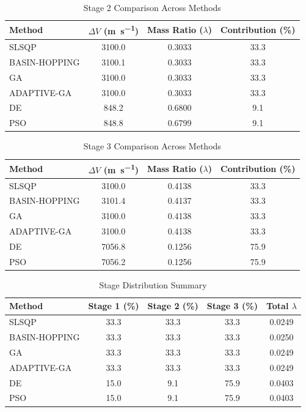 \documentclass{article}
\begin{document}
\begin{table}[H]
\centering
\caption{Stage 2 Comparison Across Methods}
\begin{tabular}{lS[table-format=4.1]S[table-format=1.4]S[table-format=3.1]}
\toprule
Method & {$\Delta V$ (\si{\meter\per\second})} & {Mass Ratio ($\lambda$)} & {Contribution (\%)} \\
\midrule
SLSQP        & 3100.0 & 0.3033 & 33.3 \\
BASIN-HOPPING & 3100.1 & 0.3033 & 33.3 \\
GA           & 3100.0 & 0.3033 & 33.3 \\
ADAPTIVE-GA  & 3100.0 & 0.3033 & 33.3 \\
DE           & 848.2 & 0.6800 & 9.1 \\
PSO          & 848.8 & 0.6799 & 9.1 \\
\bottomrule
\end{tabular}
\end{table}

\begin{table}[H]
\centering
\caption{Stage 3 Comparison Across Methods}
\begin{tabular}{lS[table-format=4.1]S[table-format=1.4]S[table-format=3.1]}
\toprule
Method & {$\Delta V$ (\si{\meter\per\second})} & {Mass Ratio ($\lambda$)} & {Contribution (\%)} \\
\midrule
SLSQP        & 3100.0 & 0.4138 & 33.3 \\
BASIN-HOPPING & 3101.4 & 0.4137 & 33.3 \\
GA           & 3100.0 & 0.4138 & 33.3 \\
ADAPTIVE-GA  & 3100.0 & 0.4138 & 33.3 \\
DE           & 7056.8 & 0.1256 & 75.9 \\
PSO          & 7056.2 & 0.1256 & 75.9 \\
\bottomrule
\end{tabular}
\end{table}

\begin{table}[H]
\centering
\caption{Stage Distribution Summary}
\begin{tabular}{lS[table-format=4.1]S[table-format=4.1]S[table-format=4.1]S[table-format=1.4]}
\toprule
Method & {Stage 1 (\%)} & {Stage 2 (\%)} & {Stage 3 (\%)} & {Total $\lambda$} \\
\midrule
SLSQP        & 33.3 & 33.3 & 33.3 & 0.0249 \\
BASIN-HOPPING & 33.3 & 33.3 & 33.3 & 0.0250 \\
GA           & 33.3 & 33.3 & 33.3 & 0.0249 \\
ADAPTIVE-GA  & 33.3 & 33.3 & 33.3 & 0.0249 \\
DE           & 15.0 & 9.1 & 75.9 & 0.0403 \\
PSO          & 15.0 & 9.1 & 75.9 & 0.0403 \\
\bottomrule
\end{tabular}
\end{table}
\end{document}
